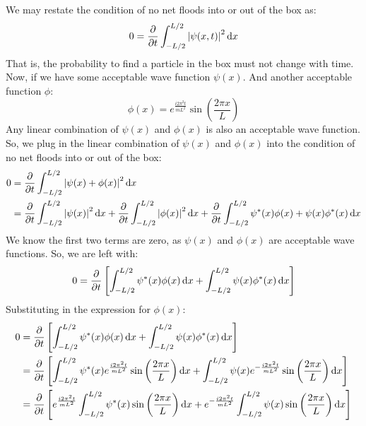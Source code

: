 \documentclass[12pt]{article}
\begin{document}
\subsection{}
We may restate the condition of no net floods into or out of the box as:
\begin{equation}
  0=\pdv{t}\int_{-L / 2}^{L / 2} \abs{\psi(x, t)}^{2} \dd{x}
\end{equation}
That is, the probability to find a particle in the box must not change with time.
Now, if we have some acceptable wave function $\psi(x)$.
And another acceptable function $\phi $:
\begin{equation}
  \phi (x)=e^{\frac{i2\pi^2t}{mL^2}}\sin\left(\frac{2\pi x}{L}\right)
\end{equation}
Any linear combination of $\psi(x)$ and $\phi(x)$ is also an acceptable wave function.
So, we plug in the linear combination of $\psi(x)$ and $\phi(x)$ into the condition of no net floods into or out of the box:
\begin{equation}
  \begin{aligned}
    0&=\pdv{t}\int_{-L / 2}^{L / 2} \abs{\psi(x)+\phi(x)}^{2} \dd{x}\\
    &=\pdv{t}\int_{-L / 2}^{L / 2} \abs{\psi(x)}^{2} \dd{x}+\pdv{t}\int_{-L / 2}^{L / 2} \abs{\phi(x)}^{2} \dd{x}+\pdv{t}\int_{-L / 2}^{L / 2}\psi^*(x)\phi(x)+\psi(x)\phi^*(x) \dd{x}\\
\end{aligned}
\end{equation}
We know the first two terms are zero, as $\psi(x)$ and $\phi(x)$ are acceptable wave functions. So, we are left with:
\begin{equation}
  0=\pdv{t}\left[\int_{-L / 2}^{L / 2} \psi^*(x)\phi(x)\dd{x}+\int_{-L / 2}^{L / 2} \psi(x)\phi^*(x) \dd{x}\right]
\end{equation}
Substituting in the expression for $\phi(x)$:
\begin{equation}
  \begin{aligned}
    0&=\pdv{t}\left[\int_{-L / 2}^{L / 2} \psi^*(x)\phi(x)\dd{x}+\int_{-L / 2}^{L / 2} \psi(x)\phi^*(x) \dd{x}\right]\\
    &=\pdv{t}\left[\int_{-L / 2}^{L / 2} \psi^*(x)e^{\frac{i2\pi^2t}{mL^2}}\sin\left(\frac{2\pi x}{L}\right)\dd{x}+\int_{-L / 2}^{L / 2} \psi(x)e^{-\frac{i2\pi^2t}{mL^2}}\sin\left(\frac{2\pi x}{L}\right) \dd{x}\right]\\
    &=\pdv{t}\left[e^{\frac{i2\pi^2t}{mL^2}}\int_{-L / 2}^{L / 2} \psi^*(x)\sin\left(\frac{2\pi x}{L}\right)\dd{x}+e^{-\frac{i2\pi^2t}{mL^2}}\int_{-L / 2}^{L / 2} \psi(x)\sin\left(\frac{2\pi x}{L}\right) \dd{x}\right]\\
\end{aligned}
\end{equation}
\end{document}
